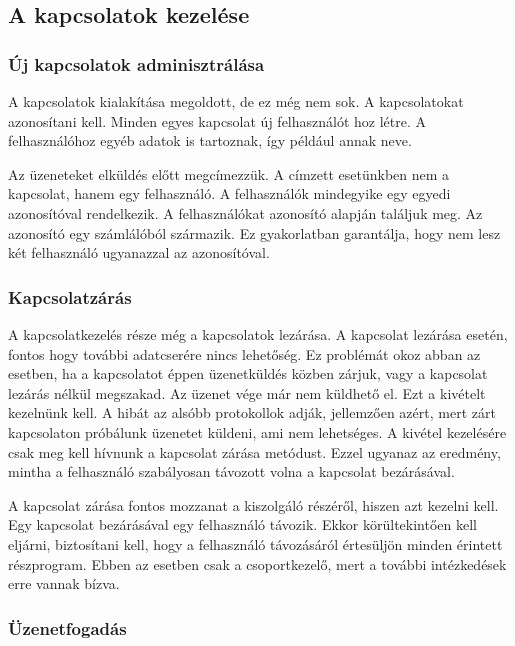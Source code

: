 \documentclass[]{article}
\begin{document}
\subsection{A kapcsolatok kezelése}


\subsubsection{Új kapcsolatok
adminisztrálása}

A kapcsolatok kialakítása megoldott, de ez még nem sok. A kapcsolatokat
azonosítani kell. Minden egyes kapcsolat új felhasználót hoz létre. A
felhasználóhoz egyéb adatok is tartoznak, így például annak neve.

Az üzeneteket elküldés előtt megcímezzük. A címzett esetünkben nem a
kapcsolat, hanem egy felhasználó. A felhasználók mindegyike egy egyedi
azonosítóval rendelkezik. A felhasználókat azonosító alapján találjuk
meg. Az azonosító egy számlálóból származik. Ez gyakorlatban garantálja,
hogy nem lesz két felhasználó ugyanazzal az azonosítóval.


\subsubsection{Kapcsolatzárás}

A kapcsolatkezelés része még a kapcsolatok lezárása. A kapcsolat
lezárása esetén, fontos hogy további adatcserére nincs lehetőség. Ez
problémát okoz abban az esetben, ha a kapcsolatot éppen üzenetküldés
közben zárjuk, vagy a kapcsolat lezárás nélkül megszakad. Az üzenet vége
már nem küldhető el. Ezt a kivételt kezelnünk kell. A hibát az alsóbb
protokollok adják, jellemzően azért, mert zárt kapcsolaton próbálunk
üzenetet küldeni, ami nem lehetséges. A kivétel kezelésére csak meg kell
hívnunk a kapcsolat zárása metódust. Ezzel ugyanaz az eredmény, mintha a
felhasználó szabályosan távozott volna a kapcsolat bezárásával.

A kapcsolat zárása fontos mozzanat a kiszolgáló részéről, hiszen azt
kezelni kell. Egy kapcsolat bezárásával egy felhasználó távozik. Ekkor
körültekintően kell eljárni, biztosítani kell, hogy a felhasználó
távozásáról értesüljön minden érintett részprogram. Ebben az esetben
csak a csoportkezelő, mert a további intézkedések erre vannak bízva.


\subsubsection{Üzenetfogadás}
\end{document}
